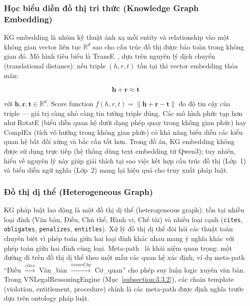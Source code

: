 \documentclass[../DoAn.tex]{subfiles}
\begin{document}
\subsubsection*{Học biểu diễn đồ thị tri thức (Knowledge Graph Embedding)}

KG embedding là nhóm kỹ thuật ánh xạ mỗi entity và relationship vào một không gian vector liên tục $\mathbb{R}^d$ sao cho cấu trúc đồ thị được bảo toàn trong không gian đó. Mô hình tiêu biểu là TransE~\cite{bordes2013transe}, dựa trên nguyên lý dịch chuyển (translational distance): nếu triple $(h, r, t)$ tồn tại thì vector embedding thỏa mãn:

\[
\mathbf{h} + \mathbf{r} \approx \mathbf{t}
\]

với $\mathbf{h}, \mathbf{r}, \mathbf{t} \in \mathbb{R}^d$. Score function $f(h, r, t) = \|\mathbf{h} + \mathbf{r} - \mathbf{t}\|$ đo độ tin cậy của triple --- giá trị càng nhỏ càng tin tưởng triple đúng. Các mô hình phức tạp hơn như RotatE (biểu diễn quan hệ dưới dạng phép quay trong không gian phức) hay ComplEx (tích vô hướng trong không gian phức) có khả năng biểu diễn các kiểu quan hệ bất đối xứng và bắc cầu tốt hơn. Trong đồ án, KG embedding không được sử dụng trực tiếp (hệ thống dùng text embedding từ Qwen3); tuy nhiên, hiểu về nguyên lý này giúp giải thích tại sao việc kết hợp cấu trúc đồ thị (Lớp~1) và biểu diễn ngữ nghĩa (Lớp~2) mang lại hiệu quả cho truy xuất pháp luật.

\subsubsection*{Đồ thị dị thể (Heterogeneous Graph)}

KG pháp luật lao động là một đồ thị dị thể (heterogeneous graph): tồn tại nhiều loại đỉnh (Văn bản, Điều, Chủ thể, Hành vi, Chế tài) và nhiều loại cạnh (\texttt{cites}, \texttt{obligates}, \texttt{penalizes}, \texttt{entitles}). Xử lý đồ thị dị thể đòi hỏi các thuật toán chuyên biệt vì phép toán giữa hai loại đỉnh khác nhau mang ý nghĩa khác với phép toán giữa hai đỉnh cùng loại. Meta-path~\cite{sun2011metapath} là khái niệm quan trọng: một đường đi trên đồ thị dị thể theo một mẫu các quan hệ xác định, ví dụ meta-path ``Điều $\xrightarrow{cites}$ Văn\_bản $\xrightarrow{issued\_by}$ Cơ\_quan'' cho phép suy luận logic xuyên văn bản. Trong VNLegalReasoningEngine (Mục~\ref{subsection:3.3.2}), các chain template (violation, entitlement, procedure) chính là các meta-path được định nghĩa trước dựa trên ontology pháp luật.
\end{document}
